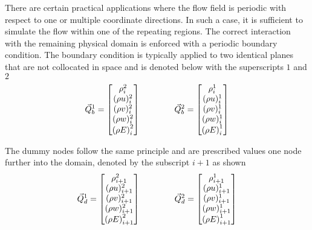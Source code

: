 There are certain practical applications where the flow field is periodic with respect to one or multiple coordinate directions. In such a case, it is sufficient to simulate the flow within one of the repeating regions. The correct interaction with the remaining physical domain is enforced with a periodic boundary condition. The boundary condition is typically applied to two identical planes that are not collocated in space and is denoted below with the superscripts $1$ and $2$
%
\begin{equation}
\vec{Q}_b^1 = \begin{bmatrix} \rho_i^2 \\
  (\rho u)_i^2 \\
  (\rho v)_i^2 \\
  (\rho w)_i^2 \\
  \qty(\rho E)_i^2 \end{bmatrix} \qquad \qquad 
\vec{Q}_b^2 = \begin{bmatrix} \rho_i^1 \\
  (\rho u)_i^1 \\
  (\rho v)_i^1 \\
  (\rho w)_i^1 \\
  \qty(\rho E)_i^1 \end{bmatrix}
\end{equation}
%

The dummy nodes follow the same principle and are prescribed values one node further into the domain, denoted by the subscript $i+1$ as shown
%
\begin{equation}
\vec{Q}_d^1 = \begin{bmatrix} \rho_{i+1}^2 \\
  (\rho u)_{i+1}^2 \\
  (\rho v)_{i+1}^2 \\
  (\rho w)_{i+1}^2 \\
  \qty(\rho E)_{i+1}^2 \end{bmatrix} \qquad \qquad 
\vec{Q}_d^2 = \begin{bmatrix} \rho_{i+1}^1 \\
  (\rho u)_{i+1}^1 \\
  (\rho v)_{i+1}^1 \\
  (\rho w)_{i+1}^1 \\
  \qty(\rho E)_{i+1}^1 \end{bmatrix}
\end{equation}



